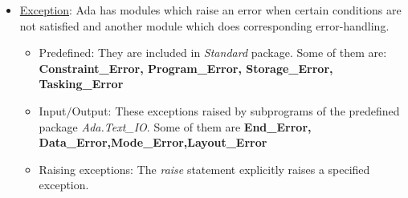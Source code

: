 \documentclass{article}
\begin{document}
\begin{itemize}
\begin{itemize}
	\end{itemize}
	\item \uline{Exception}: Ada has modules which raise an error when certain conditions are not satisfied and another module which does corresponding error-handling.
	\begin{itemize}
		\item Predefined: They are included in \emph{Standard} package. Some of them are: \textbf{Constraint\_Error, Program\_Error, Storage\_Error, Tasking\_Error}
		\item Input$/$Output: These exceptions raised by subprograms of the predefined package \emph{Ada.Text\_IO}. Some of them are \textbf{End\_Error, Data\_Error,Mode\_Error,Layout\_Error}
		\item Raising exceptions: The \emph{raise} statement explicitly raises a specified exception.
	\end{itemize}
\end{itemize}
\printbibliography
\end{document}
